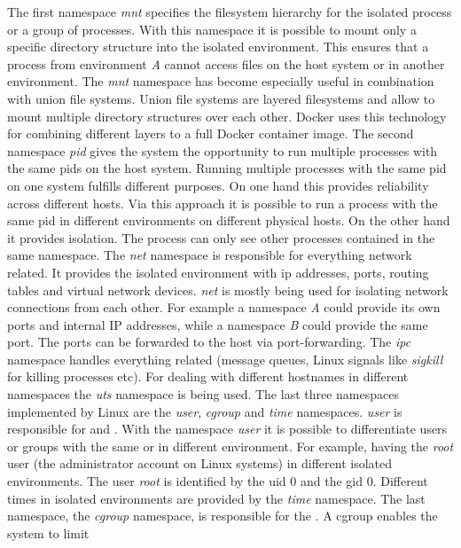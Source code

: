 \documentclass[titlepage]{report}
\begin{document}
The first namespace \emph{mnt} specifies the filesystem hierarchy for the isolated process or a group of processes. With this namespace it is possible
to mount only a specific directory structure into the isolated environment. This ensures that a process from environment \emph{A} cannot
access files on the host system or in another environment. The \emph{mnt} namespace has become especially useful in combination with union file systems.
Union file systems are layered filesystems and allow to mount multiple directory structures over each other. Docker uses this technology for combining
different layers to a full Docker container image. The second namespace \emph{pid} gives the system the opportunity to run multiple processes 
with the same \glspl{pid} on the host system. Running multiple processes with the same \gls{pid} on one system fulfills different purposes.
On one hand this provides reliability across different hosts. Via this approach it is possible to run a process with the same \gls{pid} in different
environments on different physical hosts. On the other hand it provides isolation. The process can only see other processes contained in the same namespace\cite{lwnnamespace}.
The \emph{net} namespace is responsible for everything network related. It provides the isolated environment with \gls{ip} addresses, ports, routing tables
and virtual network devices. \emph{net} is mostly being used for isolating network connections from each other. For example a namespace \emph{A} could provide
its own ports and internal IP addresses, while a namespace \emph{B} could provide the same port. The ports can be forwarded to the host via port-forwarding.
The \emph{ipc} namespace handles everything  related (message queues, Linux signals like \emph{sigkill} for killing processes etc).
For dealing with different hostnames in different namespaces the \emph{uts} namespace is being used. The last three namespaces implemented by Linux
are the \emph{user}, \emph{cgroup} and \emph{time} namespaces. \emph{user} is responsible for  and . With
the namespace \emph{user} it is possible to differentiate users or groups with the same  or  in different environment.
For example, having the \emph{root} user (the administrator account on Linux systems) in different isolated environments. The user \emph{root}
is identified by the \gls{uid} 0 and the \gls{gid} 0. Different times in isolated environments are provided by the \emph{time} namespace.
The last namespace, the \emph{cgroup} namespace, is responsible for the . A \gls{cgroup} enables the system to limit
\end{document}
